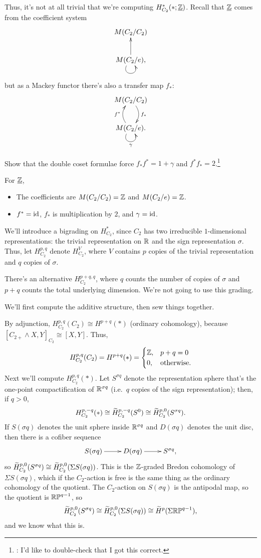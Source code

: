 Thus, it's not at all trivial that we're computing $H_{C_2}^*(*;\underline{\mathbb Z})$. Recall that $\underline{\mathbb Z}$ comes
from the coefficient system
\[\xymatrix{
	M(C_2/C_2)\\
	M(C_2/e),\ar[u]\ar@(dl,dr)_{}
}\]
but as a Mackey functor there's also a transfer map $f_*$:
\[\xymatrix{
	M(C_2/C_2)\ar@/^0.4cm/[d]^{f_*}\\
	M(C_2/e).\ar@/^0.4cm/[u]^{f^*}\ar@(dl,dr)_\gamma
}\]
\begin{ex}
Show that the double coset formulae force $f_*f^* = 1+\gamma$ and $f^*f_* = 2$.\footnote{\TODO: I'd like to
double-check that I got this correct.}
\end{ex}
For $\underline{\mathbb Z}$,
\begin{itemize}
	\item The coefficients are $M(C_2/C_2) = \mathbb Z$ and $M(C_2/e) = \mathbb Z$.
	\item $f^* = \mathrm{id}$, $f_*$ is multiplication by $2$, and $\gamma = \mathrm{id}$.
\end{itemize}
We'll introduce a bigrading on $H^*_{C_2}$, since $C_2$ has two irreducible $1$-dimensional representations: the
trivial representation on $\mathbb R$ and the sign representation $\sigma$. Thus, let $H_{C_2}^{p,q}$ denote $H_{C_2}^V$,
where $V$ contains $p$ copies of the trivial representation and $q$ copies of $\sigma$.
\begin{rem}
There's an alternative  $H_{C_2}^{p+q,q}$, where $q$ counts the number of copies of $\sigma$
and $p+q$ counts the total underlying dimension. We're not going to use this grading.
\end{rem}
We'll first compute the additive structure, then sew things together.

By adjunction, $H_{C_2}^{p,q}(C_2)\cong H^{p+q}(*)$ (ordinary cohomology), because $[C_{2+}\wedge X, Y]_{C_2}\cong
[X,Y]$. Thus,
\[H_{C_2}^{p,q}(C_2) = H^{p+q}(*) = \begin{cases}
	\mathbb Z, &p+q=0\\
	0, &\text{otherwise.}
\end{cases}\]
Next we'll compute $H_{C_2}^{p,q}(*)$. Let $S^{\sigma q}$ denote the representation sphere that's the one-point
compactification of $\mathbb R^{\sigma q}$ (i.e.\ $q$ copies of the sign representation); then, if $q > 0$,
\[H_{C_2}^{p,-q}(*)\cong \widetilde H_{C_2}^{p,-q}(S^0)\cong \widetilde H_{C_2}^{p,0}(S^{\sigma q}).\]
If $S(\sigma q)$ denotes the unit sphere inside $\mathbb R^{\sigma q}$ and $D(\sigma q)$ denotes the unit disc, then there
is a cofiber sequence
\begin{equation}
\label{signed_cofiber}
\xymatrix{
	S(\sigma q)\ar[r] & D(\sigma q)\ar[r] & S^{\sigma q},
}
\end{equation}
so $\widetilde H_{C_2}^{p,0}(S^{\sigma q})\cong\widetilde H_{C_2}^{p,0}(\Sigma S(\sigma q))$. This is the $\mathbb Z$-graded Bredon
cohomology of $\Sigma S(\sigma q)$, which if the $C_2$-action is free is the same thing as the ordinary cohomology
of the quotient. The $C_2$-action on $S(\sigma q)$ is the antipodal map, so the quotient is $\mathbb{RP}^{q-1}$, so
\[\widetilde H_{C_2}^{p,0}(S^{\sigma q})\cong \widetilde H_{C_2}^{p,0}(\Sigma S(\sigma q))\cong \widetilde H^p(\Sigma\mathbb{RP}^{q-1}),\]
and we know what this is.

